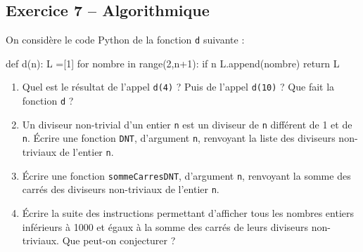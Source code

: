 \documentclass[10pt,fleqn]{article} %
\begin{document}
\begin{multicols}{2}
\subsection*{Exercice 7 -- Algorithmique }

On considère le code Python de la fonction \texttt{d} suivante :

\begin{py}
\begin{python}
def d(n):
    L =[1]
    for nombre in range(2,n+1):
        if n%
            L.append(nombre)
    return L
\end{python}
\end{py}

\begin{enumerate}
\item Quel est le résultat de l’appel \texttt{d(4)} ? Puis de l’appel \texttt{d(10)} ?
Que fait la fonction \texttt{d} ?
\item Un diviseur non-trivial d’un entier \texttt{n} est un diviseur de \texttt{n} différent de 1 et de \texttt{n}. Écrire une fonction \texttt{DNT}, d’argument \texttt{n}, renvoyant la liste des diviseurs non-triviaux de l’entier \texttt{n}.
\item Écrire une fonction \texttt{sommeCarresDNT}, d’argument \texttt{n}, renvoyant la somme des carrés des diviseurs non-triviaux de l’entier \texttt{n}.
\item Écrire la suite des instructions permettant d’afficher tous les nombres entiers inférieurs à 1000 et égaux à la somme des carrés de leurs diviseurs non-triviaux. Que peut-on conjecturer ?
\end{enumerate}


\end{multicols}
\end{document}
